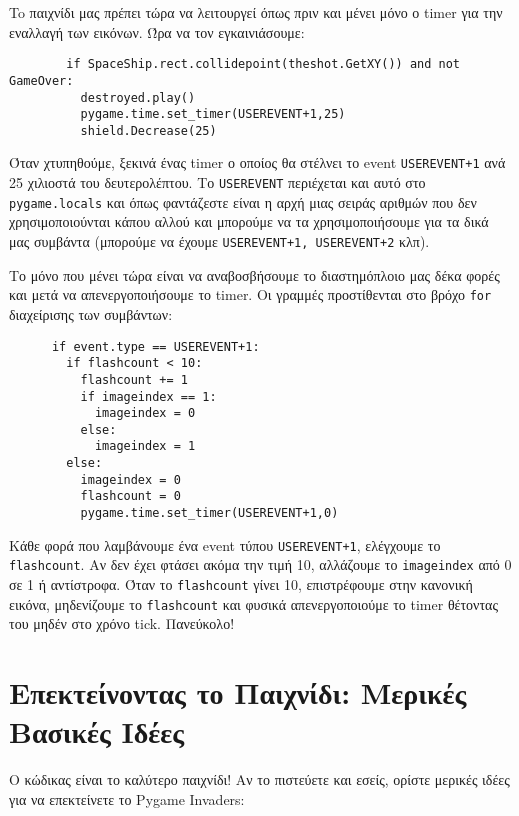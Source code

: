 To παιχνίδι μας πρέπει τώρα να λειτουργεί όπως πριν και μένει μόνο ο
   timer για την εναλλαγή των εικόνων. Ώρα να τον εγκαινιάσουμε:

\begin{verbatim}
        if SpaceShip.rect.collidepoint(theshot.GetXY()) and not GameOver:
          destroyed.play()
          pygame.time.set_timer(USEREVENT+1,25)
          shield.Decrease(25)
\end{verbatim}

Όταν χτυπηθούμε, ξεκινά ένας timer ο οποίος θα στέλνει το event {\tt USEREVENT+1}   ανά 25 χιλιοστά του δευτερολέπτου.  Το {\tt USEREVENT} περιέχεται και αυτό στο {\tt pygame.locals} και όπως φαντάζεστε είναι η αρχή μιας σειράς αριθμών που
   δεν χρησιμοποιούνται κάπου αλλού και μπορούμε να τα χρησιμοποιήσουμε για
   τα δικά μας συμβάντα (μπορούμε να έχουμε {\tt USEREVENT+1, USEREVENT+2} κλπ).

Το μόνο που μένει τώρα είναι να αναβοσβήσουμε το διαστημόπλοιο μας δέκα
   φορές και μετά να απενεργοποιήσουμε το timer. Οι γραμμές προστίθενται
   στο βρόχο {\tt for} διαχείρισης των συμβάντων:

\begin{verbatim}
      if event.type == USEREVENT+1:
        if flashcount < 10:
          flashcount += 1
          if imageindex == 1:
            imageindex = 0
          else:
            imageindex = 1
        else:
          imageindex = 0
          flashcount = 0
          pygame.time.set_timer(USEREVENT+1,0)
\end{verbatim}

Κάθε φορά που λαμβάνουμε ένα event τύπου {\tt USEREVENT+1}, ελέγχουμε το
   {\tt flashcount}. Αν δεν έχει φτάσει ακόμα την τιμή 10, αλλάζουμε το {\tt imageindex} από 0 σε 1 ή αντίστροφα. Όταν το {\tt flashcount} γίνει 10, επιστρέφουμε στην κανονική εικόνα, μηδενίζουμε το {\tt flashcount} και φυσικά απενεργοποιούμε το timer θέτοντας του μηδέν στο χρόνο tick. Πανεύκολο!

\section{Επεκτείνοντας το Παιχνίδι: Μερικές Βασικές Ιδέες}

Ο κώδικας είναι το καλύτερο παιχνίδι! Αν το πιστεύετε και εσείς, ορίστε
   μερικές ιδέες για να επεκτείνετε το Pygame Invaders:

